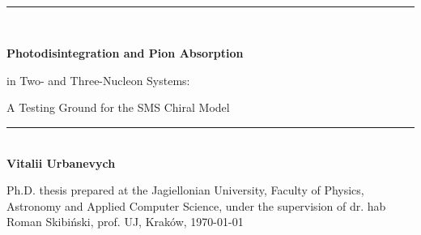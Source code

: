 \documentclass[oneside,a4paper,openright]{report}
\newcommand{\HRule}{\rule{\linewidth}{0.5mm}}
\begin{document}
\newpage

\begin{titlepage}
\begin{center}

~\\[5cm]

\HRule 
\\[0.4cm]
{
\LARGE\bfseries 
Photodisintegration and Pion Absorption

in Two- and Three-Nucleon Systems:

A Testing Ground for the SMS Chiral Model
\\[0.4cm] 
}
\HRule \\[0.4cm]

{
\LARGE
\bfseries
Vitalii Urbanevych
}
\vfill

{
\large
Ph.D. thesis prepared at the Jagiellonian University,
\newline 
Faculty of Physics, Astronomy and Applied Computer Science,
\newline 
under the supervision of dr. hab Roman Skibi\'nski, prof. UJ,
\newline 
 Krak\'ow,
}
{
\large \today
}


\end{center}
\end{titlepage}
\end{document}
